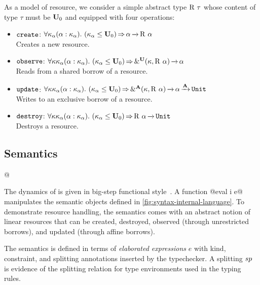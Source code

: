 As a model of resource, we consider a simple abstract
type $\tapp{\tres}{\tau}$ whose content of type $\tau$ must be $\kun_0$ and
equipped with four operations:
\begin{itemize}
\item
$\create$:
$\forall{\kvar_\tvar}\bvar{\tvar}{\kvar_\tvar}.\
\qual{\Cleq {\kvar_\tvar} {\kun_0}}
{\tvar \tarr{} \tapp\tres\tvar}$\\
Creates a new resource.

\item
$\observe$:
$\forall{\kvar\kvar_\tvar}\bvar{\tvar}{\kvar_\tvar}.\
\qual{\Cleq {\kvar_\tvar} {\kun_0}}
{\borrowty[\IBORROW]{\kvar}{\tapp\tres\tvar} \tarr{} \tvar}$\\
Reads from a shared borrow of a resource.

\item
$\update$:
$\forall{\kvar\kvar_\tvar}\bvar{\tvar}{\kvar_\tvar}.\
\qual{\Cleq {\kvar_\tvar} {\kun_0}}
\borrowty[\MBORROW]{\kvar}{\tapp\tres\tvar} \tarr{} \tvar \tarr{\kaff} \tunit$\\
Writes to an exclusive borrow of a resource.

\item
$\destroy$:
$\forall{\kvar\kvar_\tvar}\bvar{\tvar}{\kvar_\tvar}.\
\qual{\Cleq {\kvar_\tvar} {\kun_0}}
\tapp\tres\tvar \tarr{} \tunit$\\
Destroys a resource.
\end{itemize}

\subsection{Semantics}
\label{sec:sem}


\lstMakeShortInline[style=rule,basicstyle=\normalsize\normalfont]@

The dynamics of \lang is given in big-step
functional
style~\cite{siek13:_type_safet_three_easy_lemmas,DBLP:conf/esop/OwensMKT16,
  DBLP:conf/popl/AminR17}.  A function
@eval \Store \Perm \VEnv i e@
manipulates the semantic objects defined in
\cref{fig:syntax-internal-language}.
To demonstrate resource handling, the semantics comes with an abstract
notion of linear resources that can be created, destroyed, observed
(through unrestricted borrows), and
updated (through affine borrows).

The semantics is defined in terms of \emph{elaborated expressions} $e$
with kind, constraint, and splitting annotations inserted by the typechecker.
A splitting $\Sp$ is evidence of the splitting relation for type environments
used in the typing rules.

